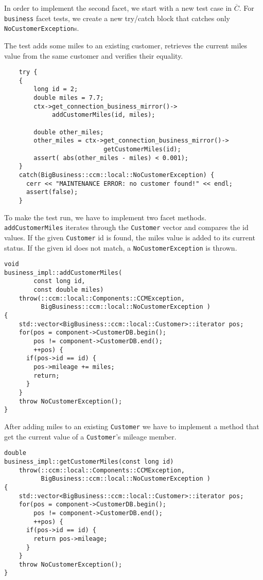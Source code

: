 In order to implement the second facet, we start with a new test case in 
$\overline{C}$.
For {\tt business} facet tests, we create a new try/catch block that catches
only {\tt NoCustomerException}s.
 
The test adds some miles to an existing customer, retrieves the current miles 
value from the same customer and verifies their equality. 

\begin{small}
\begin{verbatim}
    try {
    {
        long id = 2;
        double miles = 7.7;
        ctx->get_connection_business_mirror()->
             addCustomerMiles(id, miles); 

        double other_miles;
        other_miles = ctx->get_connection_business_mirror()->
                           getCustomerMiles(id); 
        assert( abs(other_miles - miles) < 0.001);
    }
    catch(BigBusiness::ccm::local::NoCustomerException) {
      cerr << "MAINTENANCE ERROR: no customer found!" << endl;
      assert(false);
    }
\end{verbatim}
\end{small}


To make the test run, we have to implement two facet methods.
{\tt addCustomerMiles} iterates through the {\tt Customer} vector
and compares the id values.
If the given {\tt Customer} id is found, the miles value is added to
its current status.
If the given id does not match, a {\tt NoCustomerException} is thrown.
\begin{small}
\begin{verbatim}
void
business_impl::addCustomerMiles(
        const long id,
        const double miles)
    throw(::ccm::local::Components::CCMException,
          BigBusiness::ccm::local::NoCustomerException )
{
    std::vector<BigBusiness::ccm::local::Customer>::iterator pos;
    for(pos = component->CustomerDB.begin(); 
        pos != component->CustomerDB.end(); 
        ++pos) {
      if(pos->id == id) {
        pos->mileage += miles;
        return;
      }
    }
    throw NoCustomerException();  
}
\end{verbatim}
\end{small}

After adding miles to an existing {\tt Customer} we have to implement a method
that get the current value of a {\tt Customer}'s mileage member.

\begin{small}
\begin{verbatim}
double
business_impl::getCustomerMiles(const long id)
    throw(::ccm::local::Components::CCMException,
          BigBusiness::ccm::local::NoCustomerException )
{
    std::vector<BigBusiness::ccm::local::Customer>::iterator pos;
    for(pos = component->CustomerDB.begin(); 
        pos != component->CustomerDB.end(); 
        ++pos) {
      if(pos->id == id) {
        return pos->mileage;
      }
    }
    throw NoCustomerException(); 
}
\end{verbatim}
\end{small}

